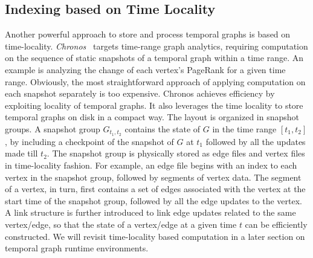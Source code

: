 \documentclass{svjour3}
\begin{document}
\subsection{Indexing based on Time Locality}
Another powerful approach to store and process temporal graphs is based on time-locality. {\em Chronos}~\cite{han2014chronos} targets time-range graph analytics, requiring computation on the sequence of static snapshots of a temporal graph within a time range. An example is analyzing the change of each vertex's PageRank for a given time range. Obviously, the most straightforward approach of applying computation on each snapshot separately is too expensive. Chronos achieves efficiency by exploiting locality of temporal graphs.
It also leverages the time locality to store temporal graphs on disk in a compact way. The layout is organized in snapshot groups. A snapshot group $G_{t_1,t_2}$ contains the state of $G$ in the time range $[t_1,t_2]$, by including a checkpoint of the snapshot of $G$ at $t_1$ followed by all the updates made till $t_2$. The snapshot group is physically stored as edge files and vertex files in time-locality fashion. For example, an edge file begins with an index to each vertex in the snapshot group, followed by segments of vertex data. The segment of a vertex, in turn, first contains a set of edges associated with the vertex at the start time of the snapshot group, followed by all the edge updates to the vertex. A link structure is further introduced to link edge updates related to the same vertex/edge, so that the state of a vertex/edge at a given time $t$ can be efficiently constructed. We will revisit time-locality based computation in a later section on temporal graph runtime environments. 
\end{document}
